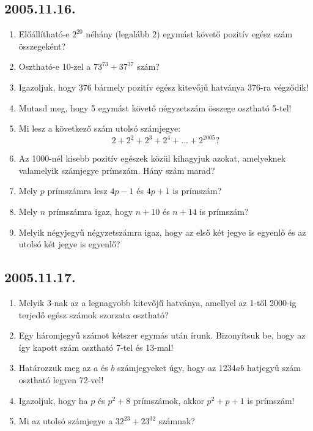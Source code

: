 \subsection*{2005.11.16.}
\begin{enumerate}
 
\item Előállítható-e $2^{20}$ néhány (legalább 2) egymást követő pozitív egész szám összegeként?

\item Osztható-e 10-zel a $73^{73}+37^{37}$ szám?

\item Igazoljuk, hogy 376 bármely pozitív egész kitevőjű hatványa 376-ra végződik!

\item Mutasd meg, hogy 5 egymást követő négyzetszám összege osztható 5-tel! 

\item Mi lesz a következő szám utolsó számjegye: $$2+2^2+2^3+2^4+...+2^{2005}?$$

\item Az 1000-nél kisebb pozitív egészek közül kihagyjuk azokat, amelyeknek valamelyik számjegye prímszám. Hány szám marad?

\item Mely $p$ prímszámra lesz $4p-1$ és $4p+1$ is prímszám?

\item Mely $n$ prímszámra igaz, hogy $n+10$ és $n+14$ is prímszám?

\item Melyik négyjegyű négyzetszámra igaz, hogy az első két jegye is egyenlő és az utolsó két jegye is egyenlő?
\end{enumerate}

\subsection*{2005.11.17.}
\begin{enumerate}
\item Melyik 3-nak az a legnagyobb kitevőjű hatványa, amellyel az 1-től 2000-ig terjedő egész számok szorzata osztható?
\item Egy háromjegyű számot kétszer egymás után írunk. Bizonyítsuk be, hogy az így kapott szám osztható 7-tel és 13-mal!
\item Határozzuk meg az $a$ és $b$ számjegyeket úgy, hogy az $\overline{1234ab}$ hatjegyű szám osztható legyen 72-vel!
\item Igazoljuk, hogy ha $p$ és $p^2+8$ prímszámok,
akkor $p^2+p+1$ is prímszám!
\item Mi az utolsó számjegye a $32^{23}+23^{32}$ számnak?
\end{enumerate}


